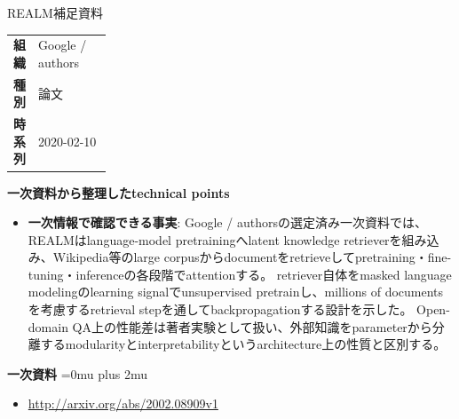 \begin{technicalnote}{REALM}{補足資料}
\begingroup
\begin{tabularx}{\linewidth}{@{}>{\bfseries}p{0.22\linewidth}X@{}}
組織 & Google / authors \\
種別 & 論文 \\
時系列 & 2020-02-10 \\
\end{tabularx}
\smallskip
\begin{minipage}{\linewidth}
{\bfseries 一次資料から整理したtechnical points}
\begin{itemize}[leftmargin=1.5em,itemsep=0.35em]
\item \textbf{一次情報で確認できる事実}: Google / authorsの選定済み一次資料では、REALMはlanguage-model pretrainingへlatent knowledge retrieverを組み込み、Wikipedia等のlarge corpusからdocumentをretrieveしてpretraining・fine-tuning・inferenceの各段階でattentionする。 retriever自体をmasked language modelingのlearning signalでunsupervised pretrainし、millions of documentsを考慮するretrieval stepを通してbackpropagationする設計を示した。 Open-domain QA上の性能差は著者実験として扱い、外部知識をparameterから分離するmodularityとinterpretabilityというarchitecture上の性質と区別する。
\end{itemize}
\begin{samepage}
{\bfseries 一次資料}
\begingroup\sloppy
\Urlmuskip=0mu plus 2mu\relax
\begin{itemize}[leftmargin=1.5em,itemsep=0.25em]
\item {\scriptsize\url{http://arxiv.org/abs/2002.08909v1}}
\end{itemize}
\endgroup
\end{samepage}
\end{minipage}
\endgroup
\end{technicalnote}
\medskip
